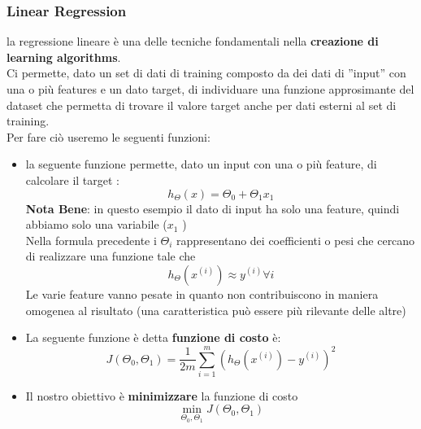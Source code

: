 \documentclass[10pt,oneside,a4paper]{article}
\begin{document}
\subsubsection{Linear Regression}
la regressione lineare è una delle tecniche fondamentali nella \textbf{creazione di learning algorithms}.\\
Ci permette, dato un set di dati di training composto da dei dati di ''input'' con una o più features e un dato target, di individuare una funzione approsimante del dataset che permetta di trovare il valore target anche per dati esterni al set di training. \\
Per fare ciò useremo le seguenti funzioni:
\begin{itemize}
 \item la seguente funzione permette, dato un input con una o più feature, di calcolare il target :
  $$h_{\Theta}(x)=\Theta_{0}+\Theta_{1}x_1$$
  \textbf{Nota Bene}: in questo esempio il dato di input ha solo una feature, quindi abbiamo solo una variabile ($ x_1$ )\\
 Nella formula precedente i $\Theta_{i}$ rappresentano dei coefficienti o pesi che cercano di realizzare una funzione tale che 
 $$h_{\Theta}(x^{(i)})\approx y^{(i)}  \forall i$$
 Le varie feature vanno pesate in quanto non contribuiscono in maniera omogenea al risultato (una caratteristica può essere più rilevante delle altre)
 \item La seguente funzione è detta \textbf{funzione di costo} è:
 $$J(\Theta_{0},\Theta_{1})= \frac{1}{2m} \sum_{i=1}^{m}(h_{\Theta}(x^{(i)})-y^{(i)})^2$$
 \item Il nostro obiettivo è \textbf{ minimizzare }la funzione di costo
 $$\min_{\Theta_{0},\Theta_{1}} J(\Theta_{0},\Theta_{1})$$
 
 \end{itemize}
 
\end{document}
